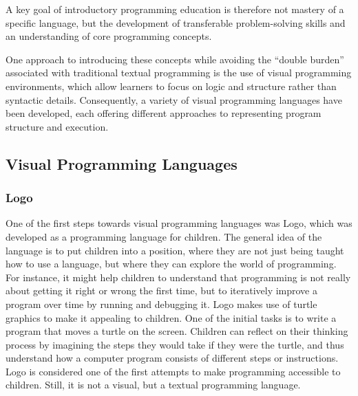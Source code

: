 A key goal of introductory programming education is therefore not mastery of a specific language, but the development of transferable problem-solving skills and an understanding of core programming concepts.

One approach to introducing these concepts while avoiding the “double burden” associated with traditional textual programming is the use of visual programming environments, which allow learners to focus on logic and structure rather than syntactic details.
Consequently, a variety of visual programming languages have been developed, each offering different approaches to representing program structure and execution.

\subsection{Visual Programming Languages}

\subsubsection{Logo}
One of the first steps towards visual programming languages was Logo, which was developed as a programming language for children\cite{papert_mindstorms_1980}.
The general idea of the language is to put children into a position, where they are not just being taught how to use a language, but where they can explore the world of programming.
For instance, it might help children to understand that programming is not really about getting it right or wrong the first time, but to iteratively improve a program over time by running and debugging it.
Logo makes use of turtle graphics to make it appealing to children.
One of the initial tasks is to write a program that moves a turtle on the screen.
Children can reflect on their thinking process by imagining the steps they would take if they were the turtle, and thus understand how a computer program consists of different steps or instructions.
Logo is considered one of the first attempts to make programming accessible to children.
Still, it is not a visual, but a textual programming language.

